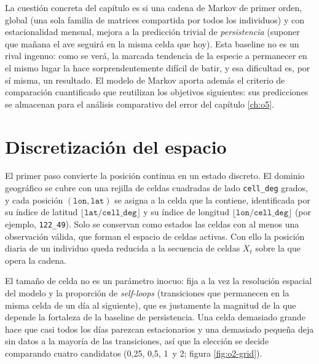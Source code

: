 La cuestión concreta del capítulo es si una cadena de Markov de primer orden,
global (una sola familia de matrices compartida por todos los individuos) y con
estacionalidad mensual, mejora a la predicción trivial de \emph{persistencia}
(suponer que mañana el ave seguirá en la misma celda que hoy). Esta baseline no es
un rival ingenuo: como se verá, la marcada tendencia de la especie a permanecer en
el mismo lugar la hace sorprendentemente difícil de batir, y esa dificultad es,
por sí misma, un resultado. El modelo de Markov aporta además el criterio de
comparación cuantificado que reutilizan los objetivos siguientes: sus predicciones
se almacenan para el análisis comparativo del error del capítulo \ref{ch:o5}.

\section{Discretización del espacio}
\label{sec:o2-discretizacion}

El primer paso convierte la posición continua en un estado discreto. El dominio
geográfico se cubre con una rejilla de celdas cuadradas de lado \texttt{cell\_deg}
grados, y cada posición $(\texttt{lon}, \texttt{lat})$ se asigna a la celda que la
contiene, identificada por su índice de latitud
$\lfloor \texttt{lat} / \texttt{cell\_deg} \rfloor$ y su índice de longitud
$\lfloor \texttt{lon} / \texttt{cell\_deg} \rfloor$ (por ejemplo, \texttt{122\_49}). Solo se conservan como estados las celdas con al
menos una observación válida, que forman el espacio de celdas activas. Con ello la
posición diaria de un individuo queda reducida a la secuencia de celdas $X_t$ sobre
la que opera la cadena.

El tamaño de celda no es un parámetro inocuo: fija a la vez la resolución espacial
del modelo y la proporción de \emph{self-loops} (transiciones que permanecen en la
misma celda de un día al siguiente), que es justamente la magnitud de la que
depende la fortaleza de la baseline de persistencia. Una celda demasiado grande
hace que casi todos los días parezcan estacionarios y una demasiado pequeña deja
sin datos a la mayoría de las transiciones, así que la elección se decide
comparando cuatro candidatos (0,25\textdegree, 0,5\textdegree, 1\textdegree\ y
2\textdegree; figura \ref{fig:o2-grid}).

